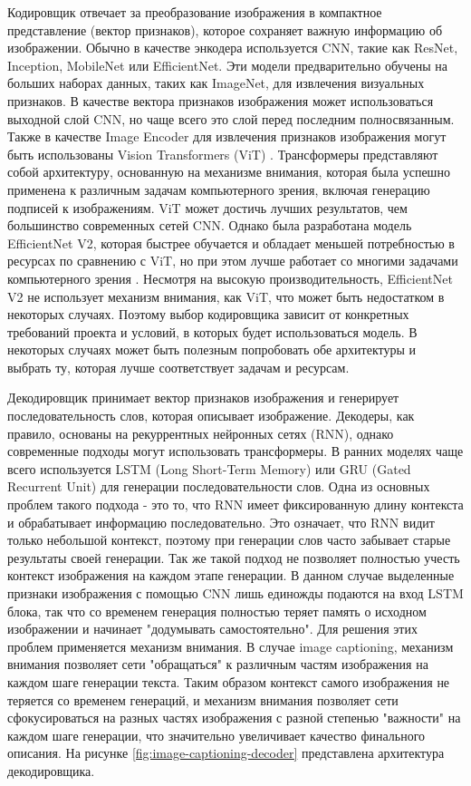 \documentclass[a4paper,12pt]{extarticle}
\begin{document}
Кодировщик отвечает за преобразование изображения в компактное представление (вектор признаков), которое сохраняет важную информацию об изображении. Обычно в качестве энкодера используется CNN, такие как ResNet, Inception, MobileNet или EfficientNet. Эти модели предварительно обучены на больших наборах данных, таких как ImageNet, для извлечения визуальных признаков. В качестве вектора признаков изображения может использоваться выходной слой CNN, но чаще всего это слой перед последним полносвязанным. Также в качестве Image Encoder для извлечения признаков изображения могут быть использованы Vision Transformers (ViT) \cite{vit}. Трансформеры представляют собой архитектуру, основанную на механизме внимания, которая была успешно применена к различным задачам компьютерного зрения, включая генерацию подписей к изображениям. ViT может достичь лучших результатов, чем большинство современных сетей CNN. Однако была разработана модель EfficientNet V2, которая быстрее обучается и обладает меньшей потребностью в ресурсах по сравнению с ViT, но при этом лучше работает со многими задачами компьютерного зрения \cite{efficientnetv2}. Несмотря на высокую производительность, EfficientNet V2 не использует механизм внимания, как ViT, что может быть недостатком в некоторых случаях. Поэтому выбор кодировщика зависит от конкретных требований проекта и условий, в которых будет использоваться модель. В некоторых случаях может быть полезным попробовать обе архитектуры и выбрать ту, которая лучше соответствует задачам и ресурсам.

Декодировщик принимает вектор признаков изображения и генерирует последовательность слов, которая описывает изображение. Декодеры, как правило, основаны на рекуррентных нейронных сетях (RNN), однако современные подходы могут использовать трансформеры. В ранних моделях чаще всего используется LSTM (Long Short-Term Memory) или GRU (Gated Recurrent Unit) для генерации последовательности слов. Одна из основных проблем такого подхода - это то, что RNN имеет фиксированную длину контекста и обрабатывает информацию последовательно. Это означает, что RNN видит только небольшой контекст, поэтому при генерации слов часто забывает старые результаты своей генерации. Так же такой подход не позволяет полностью учесть контекст изображения на каждом этапе генерации. В данном случае выделенные признаки изображения с помощью CNN лишь единожды подаются на вход LSTM блока, так что со временем генерация полностью теряет память о исходном изображении и начинает "додумывать самостоятельно". Для решения этих проблем применяется механизм внимания. В случае image captioning, механизм внимания позволяет сети "обращаться" к различным частям изображения на каждом шаге генерации текста. Таким образом контекст самого изображения не теряется со временем генераций, и механизм внимания позволяет сети сфокусироваться на разных частях изображения с разной степенью "важности" на каждом шаге генерации, что значительно увеличивает качество финального описания. На рисунке \ref{fig:image-captioning-decoder} представлена архитектура декодировщика.
\end{document}
